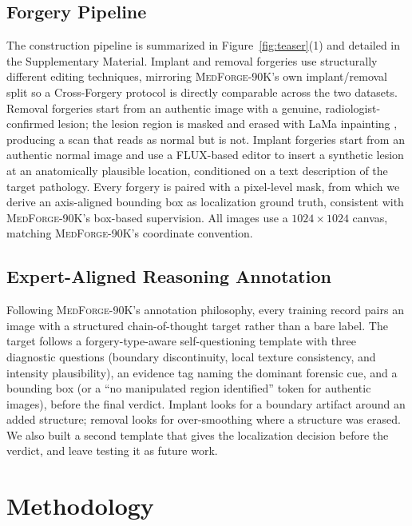 \documentclass[10pt,twocolumn,letterpaper]{article}
\newcommand{\medforge}{\textsc{MedForge}}
\begin{document}
\subsection{Forgery Pipeline}
\label{sec:pipeline}
The construction pipeline is summarized in Figure~\ref{fig:teaser}(1) and detailed in the Supplementary Material. Implant and removal forgeries use structurally different editing techniques, mirroring \medforge{}-90K's own implant/removal split so a Cross-Forgery protocol is directly comparable across the two datasets. Removal forgeries start from an authentic image with a genuine, radiologist-confirmed lesion; the lesion region is masked and erased with LaMa inpainting \cite{lama2022}, producing a scan that reads as normal but is not. Implant forgeries start from an authentic normal image and use a FLUX-based editor to insert a synthetic lesion at an anatomically plausible location, conditioned on a text description of the target pathology. Every forgery is paired with a pixel-level mask, from which we derive an axis-aligned bounding box as localization ground truth, consistent with \medforge{}-90K's box-based supervision. All images use a $1024\times1024$ canvas, matching \medforge{}-90K's coordinate convention.

\subsection{Expert-Aligned Reasoning Annotation}
\label{sec:annotation}
Following \medforge{}-90K's annotation philosophy, every training record pairs an image with a structured chain-of-thought target rather than a bare label. The target follows a forgery-type-aware self-questioning template with three diagnostic questions (boundary discontinuity, local texture consistency, and intensity plausibility), an evidence tag naming the dominant forensic cue, and a bounding box (or a ``no manipulated region identified'' token for authentic images), before the final verdict. Implant looks for a boundary artifact around an added structure; removal looks for over-smoothing where a structure was erased. We also built a second template that gives the localization decision before the verdict, and leave testing it as future work.

\section{Methodology}
\label{sec:method}
\end{document}
